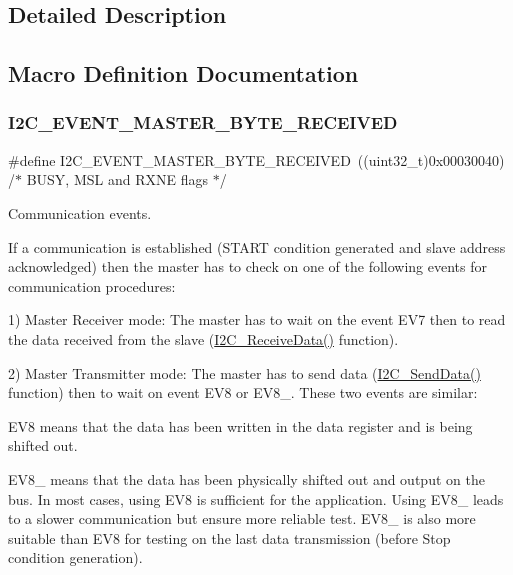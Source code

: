 \subsection{Detailed Description}


\subsection{Macro Definition Documentation}
\mbox{\label{group___i2_c___events_ga6bcf2ae49961e07e27cf9fdf334719e3}} 
\subsubsection{\texorpdfstring{I2\+C\+\_\+\+E\+V\+E\+N\+T\+\_\+\+M\+A\+S\+T\+E\+R\+\_\+\+B\+Y\+T\+E\+\_\+\+R\+E\+C\+E\+I\+V\+ED}{I2C\_EVENT\_MASTER\_BYTE\_RECEIVED}}
{\footnotesize\ttfamily \#define I2\+C\+\_\+\+E\+V\+E\+N\+T\+\_\+\+M\+A\+S\+T\+E\+R\+\_\+\+B\+Y\+T\+E\+\_\+\+R\+E\+C\+E\+I\+V\+ED~((uint32\+\_\+t)0x00030040)  /$\ast$ B\+U\+S\+Y, M\+S\+L and R\+X\+N\+E flags $\ast$/}



Communication events. 

If a communication is established (S\+T\+A\+RT condition generated and slave address acknowledged) then the master has to check on one of the following events for communication procedures\+:

1) Master Receiver mode\+: The master has to wait on the event E\+V7 then to read the data received from the slave (\mbox{\hyperlink{group___i2_c_gaeaaa4b6f77f50eb57465148c55d27fb2}{I2\+C\+\_\+\+Receive\+Data()}} function).

2) Master Transmitter mode\+: The master has to send data (\mbox{\hyperlink{group___i2_c_ga7bd9e70b8eafde0dd5eb42b0d95fe1a9}{I2\+C\+\_\+\+Send\+Data()}} function) then to wait on event E\+V8 or E\+V8\+\_. These two events are similar\+:
\begin{DoxyItemize}
\item E\+V8 means that the data has been written in the data register and is being shifted out.
\item E\+V8\+\_ means that the data has been physically shifted out and output on the bus. In most cases, using E\+V8 is sufficient for the application. Using E\+V8\+\_ leads to a slower communication but ensure more reliable test. E\+V8\+\_ is also more suitable than E\+V8 for testing on the last data transmission (before Stop condition generation).
\end{DoxyItemize}


